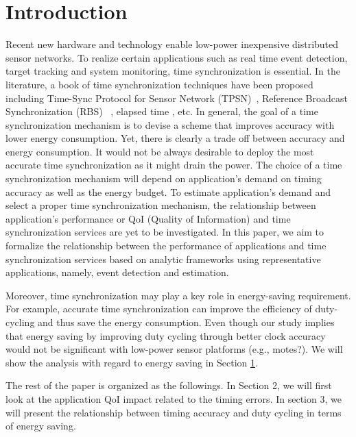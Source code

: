 \section{Introduction}
Recent new hardware and technology enable low-power inexpensive
distributed sensor networks. To realize certain applications such as
real time event detection, target tracking and system monitoring,
time synchronization is essential. In the literature, a book of time
synchronization techniques have been proposed including Time-Sync
Protocol for Sensor Network (TPSN)~\cite{ganeriwal03timingsync},
Reference Broadcast Synchronization (RBS)
~\cite{elson02finegrained}, elapsed time \cite{kusy05elapsed}, etc.
In general, the goal of a time synchronization mechanism is to
devise a scheme that improves accuracy with lower energy
consumption. Yet, there is clearly a trade off between accuracy and
energy consumption. It would not be always desirable to deploy the
most accurate time synchronization as it might drain the power. The
choice of a time synchronization mechanism will depend on
application's demand on timing accuracy as well as the energy
budget. To estimate application's demand and select a proper time
synchronization mechanism, the relationship between application's
performance or QoI (Quality of Information) and time synchronization
services are yet to be investigated. In this paper, we aim to
formalize the relationship between the performance of applications
and time synchronization services based on analytic frameworks using
representative applications, namely, event detection and estimation.


Moreover, time synchronization may play a key role in energy-saving
requirement. For example, accurate time synchronization can improve
the efficiency of duty-cycling and thus save the energy consumption.
Even though our study implies that energy saving by improving duty
cycling through better clock accuracy would not be significant with
low-power sensor platforms (e.g., motes?). We will show the analysis
with regard to energy saving in Section \ref{}.

The rest of the paper is organized as the followings. In Section 2,
we will first look at the application QoI impact related to the
timing errors. In section 3, we will present the relationship
between timing accuracy and duty cycling in terms of energy saving.
